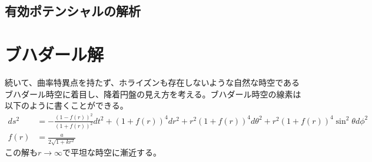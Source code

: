 \documentclass[dvipdfmx]{report} %
\begin{document}
\section{有効ポテンシャルの解析}

\chapter{ブハダール解}
続いて、曲率特異点を持たず、ホライズンも存在しないような自然な時空であるブハダール時空に着目し、降着円盤の見え方を考える。ブハダール時空の線素は以下のように書くことができる。
\begin{equation*}
\begin{split}
	ds^2 &=
		- \frac{(1 - f(r))^2}{(1 + f(r))^2} dt^2
		+ (1 + f(r))^4 dr^2
		+ r^2(1 + f(r))^4 d\theta^2
		+ r^2 (1 + f(r))^4 \sin ^2 \theta d\phi^2 \\
	f(r) &= \frac{a}{2\sqrt{1 + k r^2}} 
\end{split}
\end{equation*}
この解も$r \rightarrow \infty$で平坦な時空に漸近する。

\end{document}
